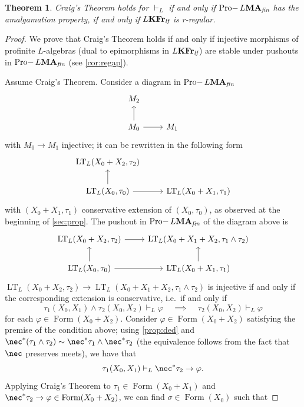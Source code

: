 \documentclass{article}
\newtheorem{thm}{Theorem}
\theoremstyle{definition}
\DeclareMathOperator{\LT}{LT}
\DeclareMathOperator{\Formulas}{Form}
\DeclareMathOperator{\Pro}{Pro-}
\newcommand{\KFr}{\textup{\textbf{KFr}}}
\newcommand{\MA}{\textup{\textbf{MA}}}
\newcommand{\fin}{\textit{fin}}
\newcommand{\lf}{\textit{lf}}
\begin{document}
\begin{thm}\label{thm:craig=amalg}
Craig's Theorem holds for $\vdash_L$ if and only if $\Pro L\MA_\fin$ has the amalgamation property, if and only if $L\KFr_\lf$ is r-regular.
\end{thm}
\begin{proof}
We prove that Craig's Theorem holds if and only if injective morphisms of profinite $L$-algebras (dual to epimorphisms in $L\KFr_\lf$) are stable under pushouts in $\Pro L\MA_\fin$ (see \cref{cor:regap}).

Assume Craig's Theorem. Consider a diagram in $\Pro L\MA_\fin$
\[\begin{tikzcd}[ampersand replacement=\&]
	{M_2} \\
	{M_0} \& {M_1}
	\arrow[from=2-1, to=1-1]
	\arrow[from=2-1, to=2-2]
\end{tikzcd}\]
with $M_0 \longrightarrow M_1$ injective; it can be rewritten in the following form
\[\begin{tikzcd}[ampersand replacement=\&]
	{\LT_L(X_0 + X_2,\tau_2)} \\
	{\LT_L(X_0,\tau_0)} \& {\LT_L(X_0 + X_1,\tau_1)}
	\arrow[from=2-1, to=1-1]
	\arrow[from=2-1, to=2-2]
\end{tikzcd}\]
with $(X_0 + X_1,\tau_1)$ conservative extension of $(X_0,\tau_0)$, as observed at the beginning of \cref{sec:prop}. The pushout in $\Pro L\MA_\fin$ of the diagram above is
\[\begin{tikzcd}[ampersand replacement=\&]
	{\LT_L(X_0 + X_2,\tau_2)} \& {\LT_L(X_0 + X_1 + X_2,\tau_1 \wedge \tau_2)} \\
	{\LT_L(X_0,\tau_0)} \& {\LT_L(X_0 + X_1,\tau_1)}
	\arrow[from=1-1, to=1-2]
	\arrow[from=2-1, to=1-1]
	\arrow[from=2-1, to=2-2]
	\arrow[from=2-2, to=1-2]
\end{tikzcd}\]
$\LT_L(X_0 + X_2,\tau_2) \longrightarrow \LT_L(X_0 + X_1 + X_2,\tau_1 \wedge \tau_2)$ is injective if and only if the corresponding extension is conservative, i.e.\ if and only if
$$\tau_1(X_0,X_1)\wedge \tau_2(X_0,X_2) \vdash_L \varphi ~~~~~\implies~~~~~ \tau_2(X_0,X_2) \vdash_L \varphi$$
for each $\varphi \in \Formulas(X_0+X_2)$.
Consider $\varphi \in \Formulas(X_0+X_2)$ satisfying the premise of the condition above; using \cref{prop:ded} and $\nec^* (\tau_1 \wedge \tau_2) \sim \nec^* \tau_1 \wedge \nec^* \tau_2$ (the equivalence follows from the fact that $\nec$ preserves meets), we have that
$$\tau_1(X_0,X_1) \vdash_L \nec^* \tau_2 \rightarrow \varphi.$$
Applying Craig's Theorem to $\tau_1 \in \Formulas(X_0+X_1)$ and $\nec^* \tau_2 \rightarrow \varphi \in \Formulas(X_0+X_2)$, we can find $\sigma \in \Formulas(X_0)$ such that

\end{proof}
\end{document}
